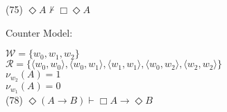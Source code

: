 (75) $ \Diamond A\nvdash  \Box \Diamond A $



Counter Model: 

\noindent $\mathcal{W} = \{ w_0,w_1,w_2\} $\\
$\mathcal{R} = \{ \langle w_0,w_0 \rangle ,\langle w_0,w_1 \rangle ,\langle w_1,w_1 \rangle ,\langle w_0,w_2 \rangle ,\langle w_2,w_2 \rangle \} $\\
$ \mathcal{\nu}_{w_2}(A)=1 $ \\
$ \mathcal{\nu}_{w_1}(A)=0 $ \\



(78) $ \Diamond (A \rightarrow  B)\vdash  \Box A \rightarrow  \Diamond B $


